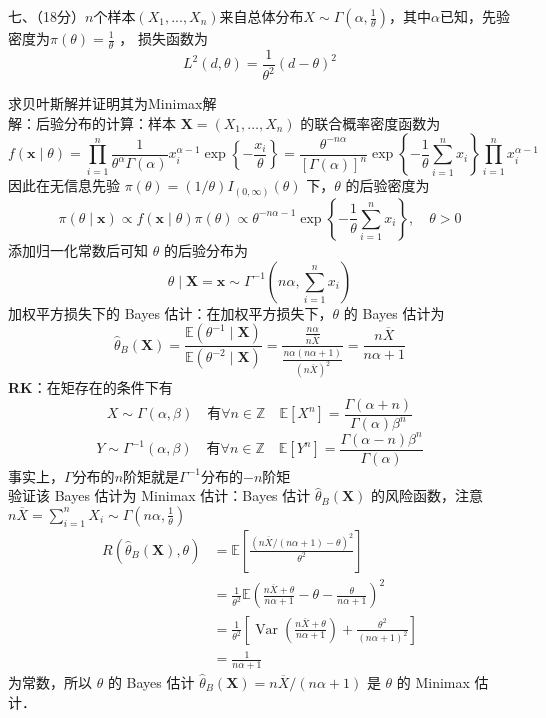 \documentclass[UTF8]{ctexart}
\begin{document}
\noindent 七、（18分）$n$个样本$(X_1,...,X_n)$来自总体分布$X\sim \Gamma\left(\alpha, \frac{1}{\theta}\right)$，其中$\alpha$已知，先验密度为$\pi(\theta) = \frac{1}{\theta} $ ，
损失函数为 
$$L^2(d,\theta) = \frac{1}{\theta^2}(d-\theta)^2$$

求贝叶斯解并证明其为Minimax解\\
解：后验分布的计算：样本 $\boldsymbol{X}=\left(X_1, \ldots, X_n\right)$ 的联合概率密度函数为
$$
f(\boldsymbol{x} \mid \theta)=\prod_{i=1}^n \frac{1}{\theta^\alpha \Gamma(\alpha)} x_i^{\alpha-1} \exp \left\{-\frac{x_i}{\theta}\right\}=\frac{\theta^{-n \alpha}}{[\Gamma(\alpha)]^n} \exp \left\{-\frac{1}{\theta} \sum_{i=1}^n x_i\right\} \prod_{i=1}^n x_i^{\alpha-1}
$$
因此在无信息先验 $\pi(\theta)=(1 / \theta) I_{(0, \infty)}(\theta)$ 下，$\theta$ 的后验密度为
$$
\pi(\theta \mid \boldsymbol{x}) \propto f(\boldsymbol{x} \mid \theta) \pi(\theta) \propto \theta^{-n \alpha-1} \exp \left\{-\frac{1}{\theta} \sum_{i=1}^n x_i\right\}, \quad \theta>0
$$
添加归一化常数后可知 $\theta$ 的后验分布为
$$
\theta \mid \boldsymbol{X}=\boldsymbol{x} \sim \Gamma^{-1}\left(n \alpha, \sum_{i=1}^n x_i\right)
$$
加权平方损失下的 Bayes 估计：在加权平方损失下，$\theta$ 的 Bayes 估计为
$$
\hat{\theta}_B(\boldsymbol{X})=\frac{\mathbb{E}\left(\theta^{-1} \mid \boldsymbol{X}\right)}{\mathbb{E}\left(\theta^{-2} \mid \boldsymbol{X}\right)}=\frac{\frac{n \alpha}{n \overline{X}}}{\frac{n \alpha(n \alpha+1)}{(n \overline{X})^2}}=\frac{n \overline{X}}{n \alpha+1}
$$
\textbf{RK}：在矩存在的条件下有\\
\[
X \sim \Gamma(\alpha,\beta) \quad \text{有} \forall n \in \mathbb{Z} \quad \mathbb{E}[X^n]=\frac{\Gamma(\alpha+n)}{\Gamma(\alpha)\beta^n}
\]
\[
Y \sim \Gamma^{-1}(\alpha,\beta) \quad \text{有} \forall n \in \mathbb{Z} \quad \mathbb{E}[Y^n]=\frac{\Gamma(\alpha-n)\beta^n}{\Gamma(\alpha)}
\]
事实上，$\Gamma$分布的$n$阶矩就是$\Gamma^{-1}$分布的$-n$阶矩\\
验证该 Bayes 估计为 Minimax 估计：Bayes 估计 $\hat{\theta}_B(\boldsymbol{X})$ 的风险函数，注意$n\overline{X}=\sum\limits_{i=1}^n X_i \sim \Gamma\left(n\alpha,\frac{1}{\theta} \right) $
$$
\begin{aligned}
	R\left(\hat{\theta}_B(\boldsymbol{X}), \theta\right) & =\mathbb{E}\left[\frac{(n \overline{X} /(n \alpha+1)-\theta)^2}{\theta^2}\right] \\
	& =\frac{1}{\theta^2} \mathbb{E}\left(\frac{n \overline{X}+\theta}{n \alpha+1}-\theta-\frac{\theta}{n \alpha+1}\right)^2 \\
	& =\frac{1}{\theta^2}\left[\operatorname{Var}\left(\frac{n \overline{X}+\theta}{n \alpha+1}\right)+\frac{\theta^2}{(n \alpha+1)^2}\right]\\
	&=\frac{1}{n \alpha+1}
\end{aligned}
$$
为常数，所以 $\theta$ 的 Bayes 估计 $\hat{\theta}_B(\boldsymbol{X})=n \overline{X} /(n \alpha+1)$ 是 $\theta$ 的 Minimax 估计．\\
\end{document}
